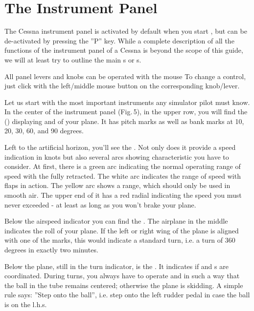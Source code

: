 \section{The Instrument Panel}

The Cessna instrument panel is activated by default when you start \FlightGear{}$\!$, but can be
de-activated by pressing the ''P'' key.  While a complete description of all the
functions of the instrument panel of a Cessna is beyond the scope of this guide, we will
at least try to outline the main s or s.

All panel levers and knobs can be operated with the mouse To change a control, just click with the left/middle mouse button on the corresponding knob/lever. 

Let us start with the most important instruments any simulator pilot must know. In the
center of the instrument panel (Fig.\,5), in the upper row, you will find the
 () displaying  and
 of your plane. It has pitch marks as well as bank marks at 10, 20, 30, 60,
and 90 degrees.

Left to the artificial horizon, you'll see the . Not only does
it provide a speed indication in knots but also several arcs showing characteristic
 you have to consider. At first, there is a green arc indicating
the normal operating range of speed with the  fully retracted. The white arc
indicates the range of speed with flaps in action. The yellow arc shows a range, which
should only be used in smooth air. The upper end of it has a red radial indicating the
speed you must never exceeded - at least as long as you won't brake your plane.

Below the airspeed indicator you can find the . The airplane in the
middle indicates the roll of your plane. If the left or right wing of the plane is
aligned with one of the marks, this would indicate a standard turn, i.e. a turn of 360
degrees in exactly two minutes.

Below the plane, still in the turn indicator, is the . It indicates
if  and s are coordinated. During turns, you always have to
operate  and  in such a way that the ball in the tube
remains centered; otherwise the plane is skidding. A simple rule says: ''Step onto the ball'', i.e. step onto the left rudder pedal in case the ball is on the l.h.s.
\medskip

